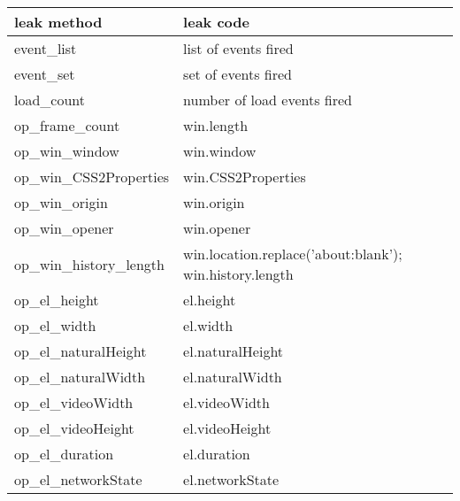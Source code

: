 \begin{tabular}{ll}
\toprule
                leak method &                                                             leak code \\
\midrule
                 event\_list &                                                  list of events fired \\
                  event\_set &                                                   set of events fired \\
                 load\_count &                                           number of load events fired \\
             op\_frame\_count &                                                            win.length \\
              op\_win\_window &                                                            win.window \\
      op\_win\_CSS2Properties &                                                    win.CSS2Properties \\
              op\_win\_origin &                                                            win.origin \\
              op\_win\_opener &                                                            win.opener \\
      op\_win\_history\_length &               win.location.replace('about:blank'); win.history.length \\
               op\_el\_height &                                                             el.height \\
                op\_el\_width &                                                              el.width \\
        op\_el\_naturalHeight &                                                      el.naturalHeight \\
         op\_el\_naturalWidth &                                                       el.naturalWidth \\
           op\_el\_videoWidth &                                                         el.videoWidth \\
          op\_el\_videoHeight &                                                        el.videoHeight \\
             op\_el\_duration &                                                           el.duration \\
         op\_el\_networkState &                                                       el.networkState \\

\end{tabular}
